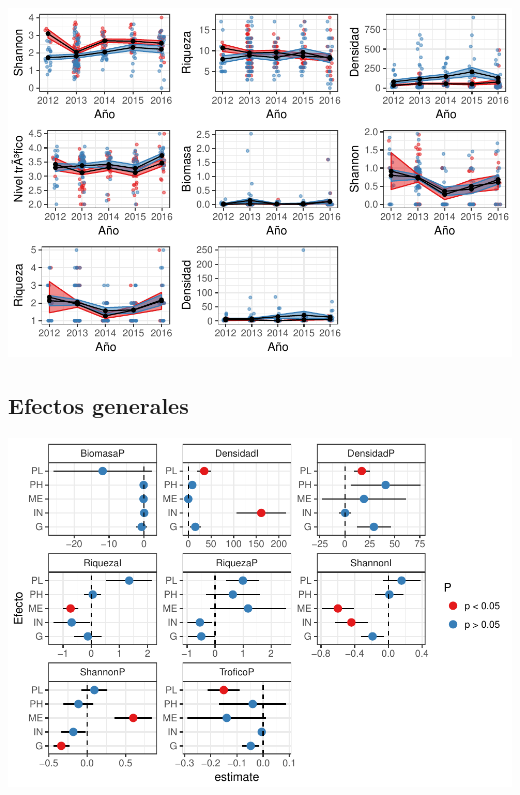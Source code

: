 \documentclass[12pt,]{article}
\begin{document}
\includegraphics{Manuscript_files/figure-latex/unnamed-chunk-11-1.pdf}

\subsection{Efectos generales}\label{efectos-generales}

\includegraphics{Manuscript_files/figure-latex/unnamed-chunk-12-1.pdf}
\end{document}
